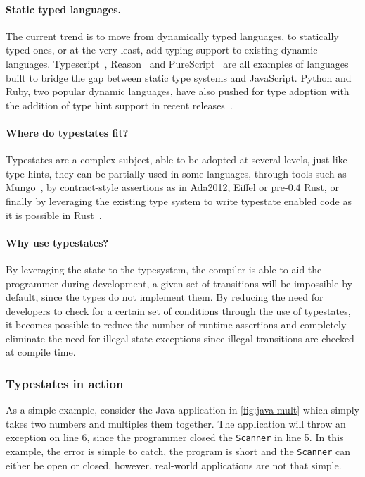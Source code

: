 \paragraph{Static typed languages.}
The current trend is to move from dynamically typed languages,
to statically typed ones, or at the very least, add typing support to existing dynamic languages.
Typescript~\autocite{typescript},
Reason~\autocite{reason} and
PureScript~\autocite{purescript}
are all examples of languages built to bridge the gap between static type systems and JavaScript.
Python and Ruby, two popular dynamic languages, have also pushed for type adoption
with the addition of type hint support in recent
releases~\autocite{PythonTyping, RubyRBS}.

\paragraph{Where do typestates fit?}
Typestates are a complex subject, able to be adopted at several levels,
just like type hints, they can be partially used in some languages,
through tools such as Mungo~\autocite{Voinea2020},
by contract-style assertions as in Ada2012, Eiffel or pre-0.4 Rust,
or finally by leveraging the existing type system to write typestate enabled code as it is possible in
Rust~\autocite{Duarte2020}.

\paragraph{Why use typestates?}
By leveraging the state to the typesystem, the compiler is able to aid the programmer during development,
a given set of transitions will be impossible by default, since the types do not implement them. %
By reducing the need for developers to check for a certain set of conditions through the use of typestates,
it becomes possible to reduce the number of runtime assertions and
completely eliminate the need for illegal state exceptions since illegal transitions are checked at compile time.


\subsubsection{Typestates in action}

As a simple example, consider the Java application in \autoref{fig:java-mult} which simply takes two numbers and multiples them together.
The application will throw an exception on line 6,
since the programmer closed the \texttt{Scanner} in line 5.
In this example, the error is simple to catch,
the program is short and the \texttt{Scanner} can either be open or closed,
however, real-world applications are not that simple.

